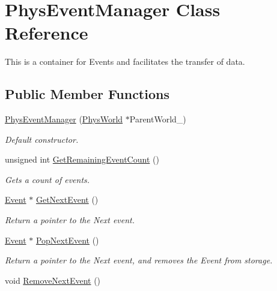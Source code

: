 \hypertarget{classPhysEventManager}{
\section{PhysEventManager Class Reference}
\label{d5/dd7/classPhysEventManager}
}


This is a container for Events and facilitates the transfer of data.  


\subsection*{Public Member Functions}
\begin{DoxyCompactItemize}
\item 
\hyperlink{classPhysEventManager_a1355f36d99de303cec6f3b27cadaa9ff}{PhysEventManager} (\hyperlink{classPhysWorld}{PhysWorld} $\ast$ParentWorld\_\-)
\begin{DoxyCompactList}\small\item\em Default constructor. \item\end{DoxyCompactList}\item 
unsigned int \hyperlink{classPhysEventManager_ab14d238e7abe9919be8e2d9eef388b64}{GetRemainingEventCount} ()
\begin{DoxyCompactList}\small\item\em Gets a count of events. \item\end{DoxyCompactList}\item 
\hyperlink{classphys_1_1Event}{Event} $\ast$ \hyperlink{classPhysEventManager_a1ab0da9e37f43c2c0d5af1dae26dcaf2}{GetNextEvent} ()
\begin{DoxyCompactList}\small\item\em Return a pointer to the Next event. \item\end{DoxyCompactList}\item 
\hyperlink{classphys_1_1Event}{Event} $\ast$ \hyperlink{classPhysEventManager_a23091695829acad90c499f6724fe048c}{PopNextEvent} ()
\begin{DoxyCompactList}\small\item\em Return a pointer to the Next event, and removes the Event from storage. \item\end{DoxyCompactList}\item 
void \hyperlink{classPhysEventManager_ad040054bd9018ff0fd27ad78ec1e87fa}{RemoveNextEvent} ()

\end{DoxyCompactItemize}
